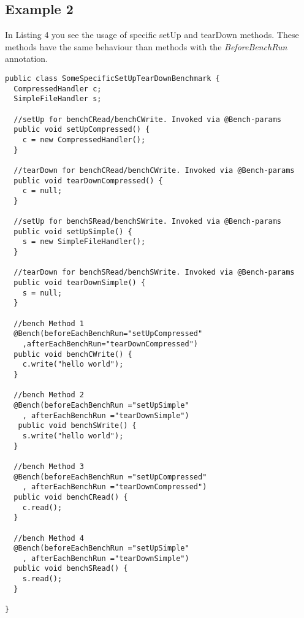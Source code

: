 \documentclass[12pt]{article}
\begin{document}
\subsection{Example 2}
In Listing 4 you see the usage of specific setUp and tearDown methods. These methods have the same behaviour than methods with the \emph{BeforeBenchRun} annotation.
\begin{lstlisting}[caption=Perfidix 2.0]
public class SomeSpecificSetUpTearDownBenchmark {
  CompressedHandler c;
  SimpleFileHandler s;

  //setUp for benchCRead/benchCWrite. Invoked via @Bench-params
  public void setUpCompressed() {
	c = new CompressedHandler();
  }

  //tearDown for benchCRead/benchCWrite. Invoked via @Bench-params
  public void tearDownCompressed() {
	c = null;
  }

  //setUp for benchSRead/benchSWrite. Invoked via @Bench-params
  public void setUpSimple() {
	s = new SimpleFileHandler();
  }

  //tearDown for benchSRead/benchSWrite. Invoked via @Bench-params
  public void tearDownSimple() {
	s = null;
  }

  //bench Method 1	
  @Bench(beforeEachBenchRun="setUpCompressed"
  	,afterEachBenchRun="tearDownCompressed")
  public void benchCWrite() {
	c.write("hello world");
  }
  
  //bench Method 2
  @Bench(beforeEachBenchRun ="setUpSimple"
  	, afterEachBenchRun ="tearDownSimple")
   public void benchSWrite() {
	s.write("hello world");
  }
  
  //bench Method 3	
  @Bench(beforeEachBenchRun ="setUpCompressed"
  	, afterEachBenchRun ="tearDownCompressed")
  public void benchCRead() {
	c.read();
  }

  //bench Method 4	
  @Bench(beforeEachBenchRun ="setUpSimple"
  	, afterEachBenchRun ="tearDownSimple")
  public void benchSRead() {
	s.read();
  }

}
\end{lstlisting}
\end{document}
